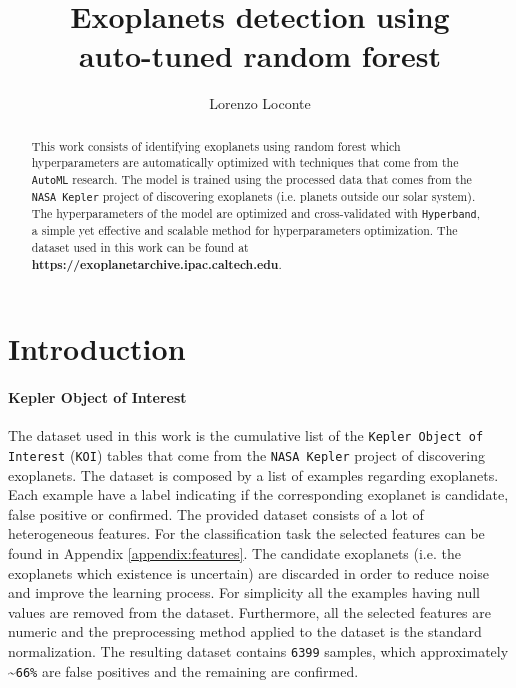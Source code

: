 \documentclass[11pt, a4paper]{article}
\date{}
\title{Exoplanets detection using \\ auto-tuned random forest}
\author{Lorenzo Loconte}
\begin{document}
\maketitle
\begin{abstract}
  This work consists of identifying exoplanets using random forest which hyperparameters are automatically optimized with techniques that come from the \texttt{AutoML} research.
  The model is trained using the processed data that comes from the \texttt{NASA Kepler} project of discovering exoplanets (i.e. planets outside our solar system).
  The hyperparameters of the model are optimized and cross-validated with \texttt{Hyperband}, a simple yet effective and scalable method for hyperparameters optimization.
  The dataset used in this work can be found at \textbf{https://exoplanetarchive.ipac.caltech.edu}.
\end{abstract}

\section{Introduction}
  \paragraph{Kepler Object of Interest}
    The dataset used in this work is the cumulative list of the \texttt{Kepler Object of Interest} (\texttt{KOI}) tables that come from the \texttt{NASA Kepler} project of discovering exoplanets.
    The dataset is composed by a list of examples regarding exoplanets. Each example have a label indicating if the corresponding exoplanet is candidate, false positive or confirmed. The provided dataset consists of a lot of heterogeneous features. For the classification task the selected features can be found in Appendix \ref{appendix:features}. The candidate exoplanets (i.e. the exoplanets which existence is uncertain) are discarded in order to reduce noise and improve the learning process.
    For simplicity all the examples having null values are removed from the dataset. Furthermore, all the selected features are numeric and the preprocessing method applied to the dataset is the standard normalization.
    The resulting dataset contains \texttt{6399} samples, which approximately \textasciitilde \texttt{66\%} are false positives and the remaining are confirmed.
    
\end{document}
